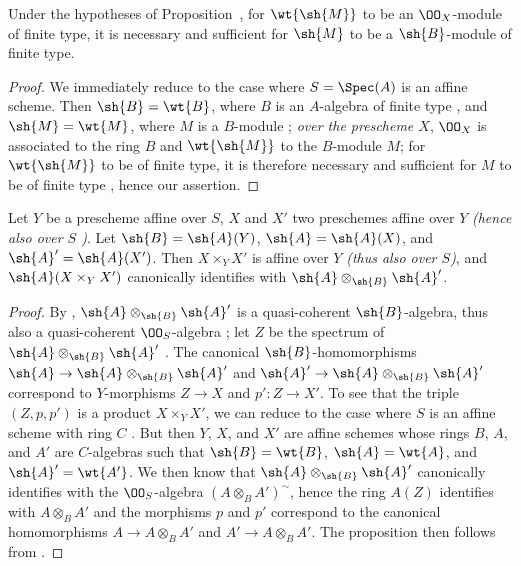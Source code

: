 \begin{cor}[1.4.5]
\label{2.1.4.5}
Under the hypotheses of Proposition~, for $\wt{\sh{M}}$ to be an $\OO_X$-module of finite type, it is necessary and sufficient for $\sh{M}$ to be a $\sh{B}$-module of finite type.
\end{cor}

\begin{proof}
\label{proof-2.1.4.5}
We immediately reduce to the case where $S=\Spec(A)$ is an affine scheme.
Then $\sh{B}=\wt{B}$, where $B$ is an $A$-algebra of finite type , and $\sh{M}=\wt{M}$, where $M$ is a $B$-module ; \emph{over the prescheme $X$}, $\OO_X$ is associated to the ring $B$ and $\wt{\sh{M}}$ to the $B$-module $M$; for $\wt{\sh{M}}$ to be of finite type, it is therefore necessary and sufficient for $M$ to be of finite type , hence our assertion.
\end{proof}

\begin{prop}[1.4.6]
\label{2.1.4.6}
Let $Y$ be a prescheme affine over $S$, $X$ and $X'$ two preschemes affine over $Y$ \emph{(hence also over $S$ )}.
Let $\sh{B}=\sh{A}(Y)$, $\sh{A}=\sh{A}(X)$, and $\sh{A}'=\sh{A}(X')$.
Then $X\times_Y X'$ is affine over $Y$ \emph{(thus also over $S$)}, and $\sh{A}(X\times_Y X')$ canonically identifies with $\sh{A}\otimes_\sh{B}\sh{A}'$.
\end{prop}

\begin{proof}
\label{proof-2.1.4.6}
By , $\sh{A}\otimes_\sh{B}\sh{A}'$ is a quasi-coherent $\sh{B}$-algebra, thus also a quasi-coherent $\OO_S$-algebra ; let $Z$ be the spectrum of $\sh{A}\otimes_\sh{B}\sh{A}'$ .
The canonical $\sh{B}$-homomorphisms $\sh{A}\to\sh{A}\otimes_\sh{B}\sh{A}'$ and $\sh{A}'\to\sh{A}\otimes_\sh{B}\sh{A}'$ correspond  to $Y$-morphisms $Z\to X$ and $p':Z\to X'$.
To see that the triple $(Z,p,p')$ is a product $X\times_Y X'$, we can reduce to the case where $S$ is an affine scheme with ring $C$ .
But then $Y$, $X$, and $X'$ are affine schemes  whose rings $B$, $A$, and $A'$ are $C$-algebras such that $\sh{B}=\wt{B}$, $\sh{A}=\wt{A}$, and $\sh{A}'=\wt{A'}$.
We then know  that $\sh{A}\otimes_\sh{B}\sh{A}'$ canonically identifies with the $\OO_S$-algebra $(A\otimes_B A')^\sim$, hence the ring $A(Z)$ identifies with $A\otimes_B A'$ and the morphisms $p$ and $p'$ correspond to the canonical homomorphisms $A\to A\otimes_B A'$ and $A'\to A\otimes_B A'$.
The proposition then follows from .
\end{proof}


